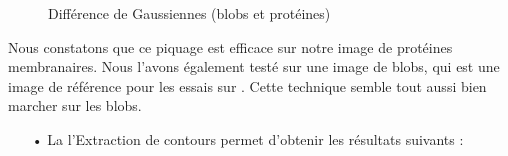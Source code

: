 \begin{figure}[!ht]
\begin{center}
\begin{minipage}{.450\linewidth}
 \end{minipage} \hfill
\caption{Différence de Gaussiennes (blobs et protéines)}
\end{center}
\end{figure}

Nous constatons que ce piquage est efficace sur notre image de protéines membranaires. Nous l'avons également testé sur une image de blobs, qui est une image de référence pour les essais sur \imj. Cette technique semble tout aussi bien marcher sur les blobs. \\
\pagebreak
\begin{itemize}
\item[•] La l'Extraction de contours permet d'obtenir les résultats suivants :
\end{itemize}

